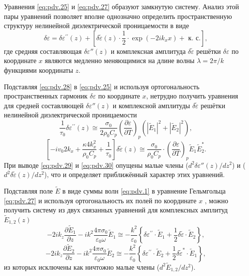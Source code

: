 Уравнения \eqref{eq:pdv.25} и \eqref{eq:pdv.27} образуют замкнутую систему. Анализ этой пары уравнений позволяет вполне однозначно определить пространственную структуру нелинейной диэлектрической проницаемости в виде
\begin{equation}
	\label{eq:pdv.28}
	\delta \varepsilon=\delta \varepsilon^{\prime \prime}(z)+\left[\delta \tilde{\varepsilon}(z) \cdot \frac{1}{2} \cdot \exp \left(-2 i k_{x} x\right)+\text{ к. с.}\right],
\end{equation}
где средняя составляющая $\delta \varepsilon'' (z)$  и комплексная амплитуда $\delta \tilde{\varepsilon}$ решётки $\delta \varepsilon$ по координате $x$ являются медленно меняющимися на длине волны $\lambda = 2\pi / k$ функциями координаты $z$.

Подставляя \eqref{eq:pdv.28} в \eqref{eq:pdv.25} и используя ортогональность пространственных гармоник $\delta \varepsilon$ по координате $x$, нетрудно получить уравнения для средней составляющей   $\delta \varepsilon'' (z)$ и комплексной амплитуды $\delta \tilde{\varepsilon}$ решётки нелинейной диэлектрической проницаемости
\begin{equation}
	\label{eq:pdv.29}
	\frac{1}{\tau_{0}} \delta \varepsilon^{\prime \prime}(z) \cong \frac{\sigma_{0}}{2 \rho_{0} C_{p}}\left(\frac{\partial \varepsilon}{\partial T}\right)_{p}\left(\left|\tilde{E}_{1}\right|^{2}+\left|\tilde{E}_{2}\right|^{2}\right),
\end{equation}
\begin{equation}
	\label{eq:pdv.30}
	\left[-i {v}_{0} 2 k_{x}+\frac{\kappa 4 k_{x}^{2}}{\rho_{0} C_{p}}+\frac{1}{\tau_{0}}\right] \delta 
	\tilde{\varepsilon}(z) \cong \frac{\sigma_{0}}{\rho_{0} C_{p}} \cdot\left(\frac{\partial \varepsilon}{\partial T}\right)_{p} \tilde{E}_{1} \tilde{E}_{2}^{*}.
\end{equation}
При выводе \eqref{eq:pdv.29} и \eqref{eq:pdv.30} опущены малые члены ($d^2 \delta \varepsilon'' (z) / d z^2$) и ($d^2 \delta \tilde\varepsilon (z) / d z^2$)‚ что и определяет приближённый характер этих уравнений.

Подставляя поле $\tilde{E}$ в виде суммы волн \eqref{eq:pdv.1} в уравнение Гельмгольца \eqref{eq:pdv.27}
и используя ортогональность их полей по координате $x$ ‚ можно получить систему из двух связанных уравнений для комплексных амплитуд $\tilde{E}_{1,2}(z)$
\begin{equation}
	\label{eq:pdv.31}
	-2 i k_{z} \frac{\partial \tilde{E}_{1}}{\partial z}-i k^{2} \frac{4 \pi \sigma_{0}}{\varepsilon_{0} \omega} \tilde{E}_{1} \cong-\frac{k^{2}}{\varepsilon_{0}}\left\{\delta \varepsilon^{\prime \prime} \cdot \tilde{E}_{1}+\frac{1}{2} \delta \tilde{\varepsilon} \cdot \tilde{E}_{2}\right\},
\end{equation}
\begin{equation}
	\label{eq:pdv.32}
	-2 i k_{z} \frac{\partial \tilde{E}_{2}}{\partial z}-i k^{2} \frac{4 \pi \sigma_{0}}{\varepsilon_{0} \omega} \tilde{E}_{2} \cong-\frac{k^{2}}{\varepsilon_{0}}\left\{\delta \varepsilon^{\prime \prime} \cdot \tilde{E}_{2}+\frac{1}{2} \delta \tilde{\varepsilon}^{*} \cdot \tilde{E}_{1}\right\},
\end{equation}
из которых исключены как ничтожно малые члены ($d^2 \tilde{E}_{1,2} / dz^2$).

